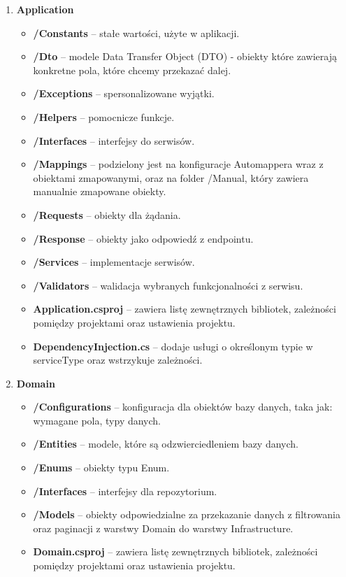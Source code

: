 \documentclass[a4paper,twoside,12pt]{book}
\begin{document}
\begin{enumerate}
    \item \textbf{Application} \begin{itemize}
        \item \textbf{/Constants} -- stałe wartości, użyte w aplikacji.
        \item \textbf{/Dto} -- modele Data Transfer Object (DTO) - obiekty które zawierają konkretne pola, które chcemy przekazać dalej.
        \item \textbf{/Exceptions} -- spersonalizowane wyjątki.
        \item \textbf{/Helpers} -- pomocnicze funkcje.
        \item \textbf{/Interfaces} -- interfejsy do serwisów.
        \item \textbf{/Mappings} -- podzielony jest na konfiguracje Automappera wraz z obiektami zmapowanymi, oraz na folder /Manual, który zawiera manualnie zmapowane obiekty.
        \item \textbf{/Requests} -- obiekty dla żądania.
        \item \textbf{/Response} -- obiekty jako odpowiedź z endpointu.
        \item \textbf{/Services} -- implementacje serwisów.
        \item \textbf{/Validators} -- walidacja wybranych funkcjonalności z serwisu.
        \item \textbf{Application.csproj} -- zawiera listę zewnętrznych bibliotek, zależności pomiędzy projektami oraz ustawienia projektu.
        \item \textbf{DependencyInjection.cs} -- dodaje usługi o określonym typie w serviceType oraz wstrzykuje zależności.
    \end{itemize}

    \item \textbf{Domain} \begin{itemize}
        \item \textbf{/Configurations } -- konfiguracja dla obiektów bazy danych, taka jak: wymagane pola, typy danych.
        \item \textbf{/Entities} -- modele, które są odzwierciedleniem bazy danych.
        \item \textbf{/Enums} -- obiekty typu Enum.
        \item \textbf{/Interfaces} -- interfejsy dla repozytorium.
        \item \textbf{/Models} -- obiekty odpowiedzialne za przekazanie danych z filtrowania oraz paginacji z warstwy Domain do warstwy Infrastructure.
        \item \textbf{Domain.csproj} -- zawiera listę zewnętrznych bibliotek, zależności pomiędzy projektami oraz ustawienia projektu.
    \end{itemize}


\end{enumerate}
\end{document}
